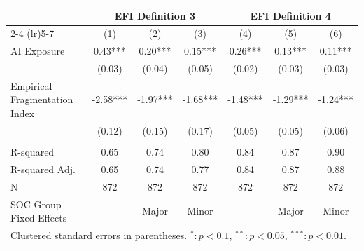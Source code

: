 \setlength{\tabcolsep}{6pt} %
\begin{tabular}{lcccccc}
\toprule
 & \multicolumn{3}{c}{EFI Definition 3} & \multicolumn{3}{c}{EFI Definition 4} \\
 \cmidrule(lr){2-4} \cmidrule(lr){5-7}
 & (1) & (2) & (3) & (4) & (5) & (6) \\
\midrule
\addlinespace
AI Exposure            & 0.43***  & 0.20***  & 0.15***  & 0.26***  & 0.13***  & 0.11***   \\
                        & (0.03)   & (0.04)   & (0.05)   & (0.02)   & (0.03)   & (0.03)    \\
Empirical Fragmentation Index    & -2.58*** & -1.97*** & -1.68*** & -1.48*** & -1.29*** & -1.24***  \\
                        & (0.12)   & (0.15)   & (0.17)   & (0.05)   & (0.05)   & (0.06)    \\
\hline\\[-1.25em]
R-squared               & 0.65     & 0.74     & 0.80     & 0.84     & 0.87     & 0.90      \\
R-squared Adj.          & 0.65     & 0.74     & 0.77     & 0.84     & 0.87     & 0.88      \\
N                       & 872      & 872      & 872      & 872      & 872      & 872       \\
SOC Group Fixed Effects &          & Major    & Minor    &          & Major    & Minor     \\
\bottomrule
\multicolumn{7}{l}{\footnotesize Clustered standard errors in parentheses. $^{*}:p<0.1$, $^{**}:p<0.05$, $^{***}:p<0.01$.} \\
\end{tabular}